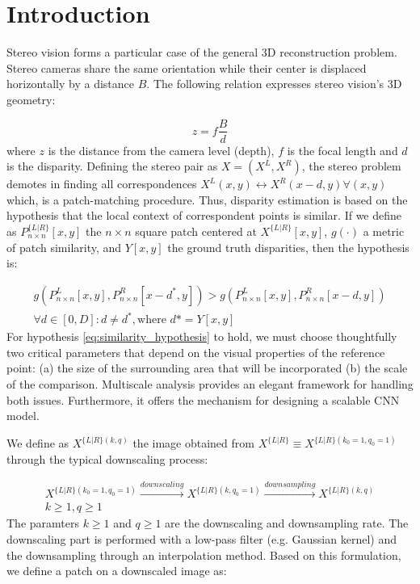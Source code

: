 \documentclass[runningheads]{llncs}
\begin{document}
\section{Introduction}

Stereo vision forms a particular case of the general 3D reconstruction problem. Stereo cameras share the same orientation while their center is displaced horizontally by a distance $B$. The following relation expresses stereo vision's 3D geometry:

\begin{equation} \label{eq:stereo_geometry}
z = f\frac{B}{d}
\end{equation}
%
where $z$ is the distance from the camera level (depth), $f$ is the focal length and $d$ is the disparity. Defining the stereo pair as $X = (X^L, X^R)$, the stereo problem demotes in finding all correspondences $X^L(x,y) \leftrightarrow X^R(x-d, y) \forall (x,y)$ which, is a patch-matching procedure. Thus, disparity estimation is based on the hypothesis that the local context of correspondent points is similar. If we define as $P^{ \{L|R\} }_{n \times n}[x,y]$ the  $n \times n$ square patch centered at $X^{ \{L|R\} }[x,y]$, $g(\cdot)$ a metric of patch similarity, and $Y[x,y]$ the ground truth disparities, then the hypothesis is:

\begin{equation}
\begin{gathered} \label{eq:similarity_hypothesis}
    g(P^L_{n \times n}[x,y], P^R_{n \times n}[x-d^*,y]) > g(P^L_{n \times n}[x,y], P^R_{n \times n}[x-d,y]) \\
    \forall d \in [0,D] : d \neq d^*, \text{where $d* = Y[x,y]$}
\end{gathered}
\end{equation}
%
For hypothesis \ref{eq:similarity_hypothesis} to hold, we must choose thoughtfully two critical parameters that depend on the visual properties of the reference point: (a) the size of the surrounding area that will be incorporated (b) the scale of the comparison. Multiscale analysis provides an elegant framework for handling both issues. Furthermore, it offers the mechanism for designing a scalable CNN model.

We define as $X^{ \{L|R\} (k,q)}$ the image obtained from $X^{ \{L|R\}} \equiv X^{ \{L|R\} (k_0=1,q_0=1)}$ through the typical downscaling process:

\begin{equation}
\begin{gathered} \label{eq:downsampling_procedure}
    X^{ \{L|R\} (k_0=1,q_0=1)} \xrightarrow{downscaling} 
    X^{ \{L|R\} (k,q_0=1)} \xrightarrow{downsampling} 
    X^{ \{L|R\} (k,q)}
    \\
    k\geq 1, q\geq 1 
\end{gathered}
\end{equation}
%
The paramters $k \geq 1$ and $q \geq 1$ are the downscaling and downsampling rate. The downscaling part is performed with a low-pass filter (e.g. Gaussian kernel) and the downsampling through an interpolation method. Based on this formulation, we define a patch on a downscaled image as:
\end{document}
